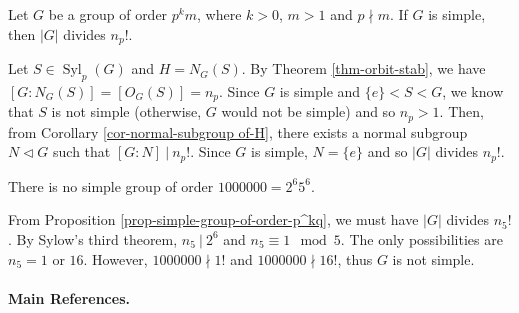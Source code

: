 \begin{proposition}\label{prop-simple-group-of-order-p^kq}
	Let $G$ be a group of order $p^km$, where $k > 0$, $m > 1$ and $p \nmid m$. If $G$ is simple, then $|G|$ divides $n_p!$.
\end{proposition}
\begin{sketch}
	Let $S \in \operatorname{Syl}_p(G)$ and $H = N_G(S)$. By Theorem \ref{thm-orbit-stab}, we have $[G:N_G(S)] = [O_G(S)] = n_p$. Since $G$ is simple and $\{e\} < S < G$, we know that $S$ is not simple (otherwise, $G$ would not be simple) and so $n_p > 1$. Then, from Corollary \ref{cor-normal-subgroup of-H}, there exists a normal subgroup $N \lhd G$ such that $[G:N] ~|~ n_p!$. Since $G$ is simple, $N = \{e\}$ and so $|G|$ divides $n_p!$.
\end{sketch}

\begin{corollary}
	There is no simple group of order $1000000 = 2^6 5^6$.
\end{corollary}
\begin{sketch}
	From Proposition \ref{prop-simple-group-of-order-p^kq}, we must have $|G|$ divides $n_5!$. By Sylow's third theorem, $n_5 ~|~ 2^6$ and $n_5 \equiv 1 \mod 5$. The only possibilities are $n_5 = 1$ or $16$. However, $1000000 \nmid 1!$ and $1000000 \nmid 16!$, thus $G$ is not simple.
\end{sketch}

\paragraph{Main References.} \cite{Hungerford1974,DummitFoote2004,Isaacs2009}
